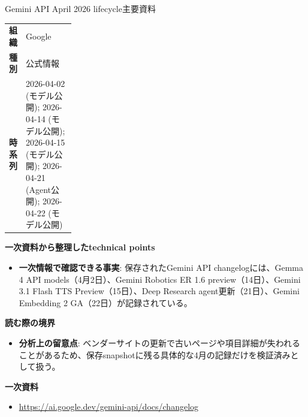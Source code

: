 \begin{technicalnote}{Gemini API April 2026 lifecycle}{主要資料}
\begingroup
\begin{tabularx}{\linewidth}{@{}>{\bfseries}p{0.22\linewidth}X@{}}
組織 & Google \\
種別 & 公式情報 \\
時系列 & 2026-04-02 (モデル公開); 2026-04-14 (モデル公開); 2026-04-15 (モデル公開); 2026-04-21 (Agent公開); 2026-04-22 (モデル公開) \\
\end{tabularx}
\smallskip
{\bfseries 一次資料から整理したtechnical points}
\begin{itemize}[leftmargin=1.5em,itemsep=0.35em]
\item \textbf{一次情報で確認できる事実}: 保存されたGemini API changelogには、Gemma 4 API models（4月2日）、Gemini Robotics ER 1.6 preview（14日）、Gemini 3.1 Flash TTS Preview（15日）、Deep Research agent更新（21日）、Gemini Embedding 2 GA（22日）が記録されている。
\end{itemize}
{\bfseries 読む際の境界}
\begin{itemize}[leftmargin=1.5em,itemsep=0.35em]
\item \textbf{分析上の留意点}: ベンダーサイトの更新で古いページや項目詳細が失われることがあるため、保存snapshotに残る具体的な4月の記録だけを検証済みとして扱う。
\end{itemize}
\begin{samepage}
{\bfseries 一次資料}
\begingroup\sloppy
\begin{itemize}[leftmargin=1.5em,itemsep=0.25em]
\item {\scriptsize\url{https://ai.google.dev/gemini-api/docs/changelog}}
\end{itemize}
\endgroup
\end{samepage}
\endgroup
\end{technicalnote}
\medskip

